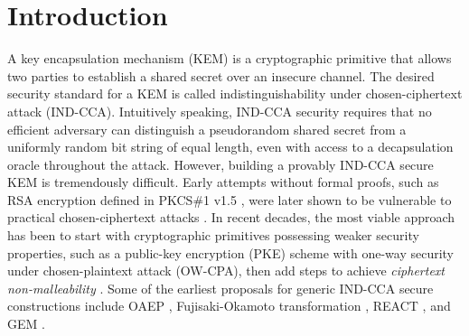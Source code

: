 \documentclass[journal=tches,submission]{iacrtrans}
\begin{document}
\section{Introduction}\label{sec:introduction}
A key encapsulation mechanism (KEM) \cite{DBLP:journals/iacr/Shoup01} is a cryptographic primitive that allows two parties to establish a shared secret over an insecure channel. The desired security standard for a KEM is called indistinguishability under chosen-ciphertext attack (IND-CCA). Intuitively speaking, IND-CCA security requires that no efficient adversary can distinguish a pseudorandom shared secret from a uniformly random bit string of equal length, even with access to a decapsulation oracle throughout the attack. However, building a provably IND-CCA secure KEM is tremendously difficult. Early attempts without formal proofs, such as RSA encryption defined in PKCS\#1 v1.5 \cite{DBLP:journals/rfc/rfc2313}, were later shown to be vulnerable to practical chosen-ciphertext attacks \cite{DBLP:conf/crypto/Bleichenbacher98}. In recent decades, the most viable approach has been to start with cryptographic primitives possessing weaker security properties, such as a public-key encryption (PKE) scheme with one-way security under chosen-plaintext attack (OW-CPA), then add steps to achieve \emph{ciphertext non-malleability} \cite{DBLP:conf/asiacrypt/BellareN00}. Some of the earliest proposals for generic IND-CCA secure constructions include OAEP \cite{DBLP:conf/eurocrypt/BellareR94}, Fujisaki-Okamoto transformation \cite{DBLP:conf/crypto/FujisakiO99}\cite{DBLP:journals/joc/FujisakiO13}, REACT \cite{DBLP:conf/ctrsa/OkamotoP01}, and GEM \cite{DBLP:conf/ctrsa/CoronHJPPT02}.
\end{document}
